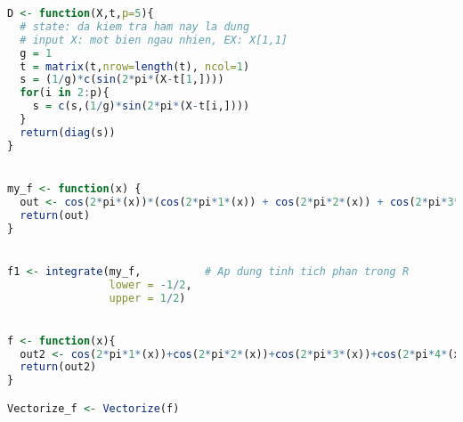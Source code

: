 \begin{lstlisting}[language=R, title = Phần 1: Các hàm sử dụng trong chương trình]
D <- function(X,t,p=5){
  # state: da kiem tra ham nay la dung
  # input X: mot bien ngau nhien, EX: X[1,1]
  g = 1
  t = matrix(t,nrow=length(t), ncol=1)
  s = (1/g)*c(sin(2*pi*(X-t[1,])))
  for(i in 2:p){
    s = c(s,(1/g)*sin(2*pi*(X-t[i,])))
  }
  return(diag(s))
}


my_f <- function(x) {    
  out <- cos(2*pi*(x))*(cos(2*pi*1*(x)) + cos(2*pi*2*(x)) + cos(2*pi*3*(x)) + cos(2*pi*4*(x)) + cos(2*pi*5*(x)))
  return(out)
}


f1 <- integrate(my_f,          # Ap dung tinh tich phan trong R
                lower = -1/2,
                upper = 1/2)


f <- function(x){
  out2 <- cos(2*pi*1*(x))+cos(2*pi*2*(x))+cos(2*pi*3*(x))+cos(2*pi*4*(x))+cos(2*pi*5*(x))
  return(out2)
}

Vectorize_f <- Vectorize(f)
\end{lstlisting}

